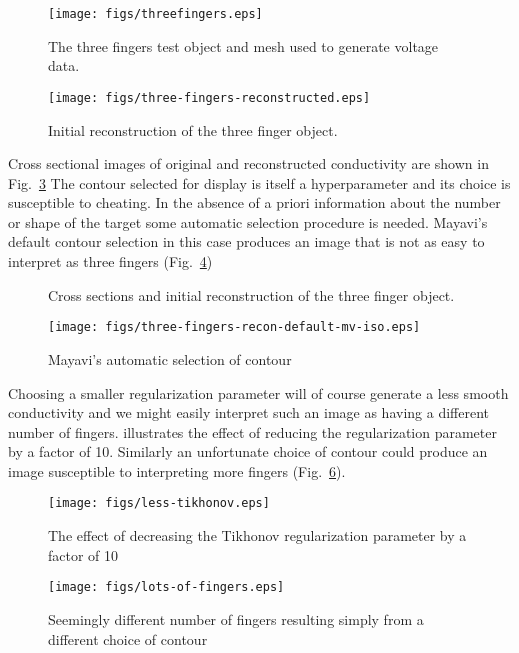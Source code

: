 \documentclass[12pt]{iopart}
\begin{document}
%
%
\begin{figure}[th]
\texttt{[image: figs/threefingers.eps]}
\caption{\label{fig:threefingers}The three fingers test object and mesh used to generate voltage data.}
\end{figure}



%
%
\begin{figure}[th]
\texttt{[image: figs/three-fingers-reconstructed.eps]}
\caption{\label{fig:3fingers1}
Initial reconstruction of the three finger object.}
\end{figure}

Cross sectional images of original and reconstructed
conductivity are shown in Fig.~\ref{fig:3fingersXsect}
The contour selected for display is itself a
hyperparameter and its choice is susceptible to
cheating. In the absence of a priori information about
the number or shape of the target some automatic selection
procedure is needed. Mayavi's default contour selection
in this case produces an image that is not as easy to
interpret as three fingers (Fig.~\ref{fig:3fingersMVdefault})

%
%
\begin{figure}[th]

\caption{\label{fig:3fingersXsect}
Cross sections and initial reconstruction of the three finger object.}
\end{figure}

%
%
\begin{figure}[th]
\texttt{[image: figs/three-fingers-recon-default-mv-iso.eps]}
\caption{\label{fig:3fingersMVdefault}
Mayavi's automatic selection of contour}
\end{figure}
Choosing a smaller regularization parameter will of
course generate a less smooth conductivity and we might
easily interpret such an image as having a different number
of fingers.
 illustrates the effect of
reducing the regularization parameter by a factor of
10. Similarly an unfortunate choice of contour could
produce an image susceptible to interpreting more fingers
(Fig.~\ref{fig:3fingersMoreFingers}).
\begin{figure}[th]
\texttt{[image: figs/less-tikhonov.eps]}
\caption{\label{fig:3fingersLessTik}
The effect of decreasing the Tikhonov regularization parameter
 by a factor of 10}
\end{figure}
\begin{figure}[th]
\texttt{[image: figs/lots-of-fingers.eps]}
\caption{\label{fig:3fingersMoreFingers}
Seemingly different number of fingers resulting simply from a
 different choice of contour}
\end{figure}
\end{document}
